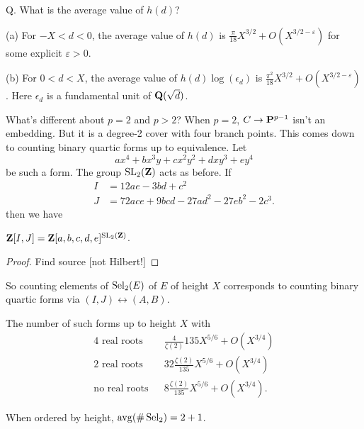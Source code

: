 Q. What is the average value of $h(d)$?

\begin{theorem}
(a) For $-X<d<0$, the average value of $h(d)$ is $\frac{\pi}{18} X^{3/2} + O(X^{3/2-\varepsilon})$ for some explicit $\varepsilon>0$. 

(b) For $0<d<X$, the average value of $h(d)\log(\epsilon_d)$ is 
$\frac{\pi^2}{18} X^{3/2}+O(X^{3/2-\varepsilon})$. Here 
$\epsilon_d$ is a fundamental unit of $\mathbf{Q}(\sqrt d)$. 
\end{theorem}

What's different about $p=2$ and $p>2$? When $p=2$, 
$C\to \mathbf{P}^{p-1}$ isn't an embedding. But it is a degree-2 cover with four 
branch points. This comes down to counting binary quartic forms up to 
equivalence. Let 
\[
  a x^4 + b x^3 y + c x^2 y^2 + d x y^3 + e y^4 
\]
be such a form. The group $\operatorname{SL}_2(\mathbf{Z})$ acts as before. If 
\begin{align*}
  I &= 12 a e - 3 b d + c^2 \\
  J &= 72 a c e + 9 b c d - 27 a d^2 - 27 e b^2 - 2 c^3 .
\end{align*}
then we have 

\begin{theorem}
$\mathbf{Z}[I,J] = \mathbf{Z}[a,b,c,d,e]^{\operatorname{SL}_2(\mathbf{Z})}$. 
\end{theorem}
\begin{proof}
Find source [not Hilbert!]
\end{proof}

So counting elements of $\operatorname{Sel}_2(E)$ of $E$ of height $X$ corresponds to counting 
binary quartic forms via $(I,J)\leftrightarrow (A,B)$. 

\begin{theorem}
The number of such forms up to height $X$ with 
\begin{align*}
  4\text{ real roots} && \frac{4}{\zeta(2)}{135} X^{5/6}+O(X^{3/4}) \\
  2\text{ real roots} && 32 \frac{\zeta(2)}{135} X^{5/6} + O(X^{3/4}) \\
  \text{no real roots} && 8 \frac{\zeta(2)}{135} X^{5/6} + O(X^{3/4}) .
\end{align*}
\end{theorem}

\begin{corollary}
When ordered by height, $\operatorname{avg}(\#\operatorname{Sel}_2)=2+1$. 
\end{corollary}


